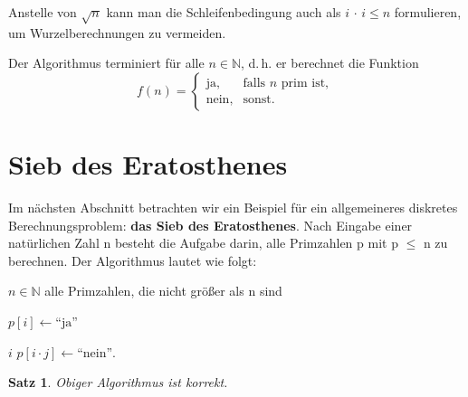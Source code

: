 \documentclass{article}
\newcommand{\N}{\mathbb{N}}%
\newtheorem{thm}{Satz}
\begin{document}
Anstelle von $\sqrt{n}$ kann man die Schleifenbedingung auch als $i\, \cdot \, i \le n$ formulieren, um Wurzelberechnungen zu vermeiden.

\medskip

Der Algorithmus terminiert für alle $n \in \mathbb{N}$, d.\,h. er berechnet die Funktion
\[
f(n) =
\begin{cases}
\text{ja}, & \text{falls $n$ prim ist},\\
\text{nein}, & \text{sonst}.
\end{cases}
\]


\section{Sieb des Eratosthenes}

Im nächsten Abschnitt betrachten wir ein Beispiel für ein allgemeineres diskretes Berechnungsproblem: \textbf{das Sieb des Eratosthenes}. Nach Eingabe einer natürlichen Zahl n besteht die Aufgabe darin, alle Primzahlen p mit p $\le$ n zu berechnen. Der Algorithmus lautet wie folgt:


\begin{algorithm}
\caption{Sieb des Eratosthenes}
\begin{algorithmic}[2]

\Require $n \in \N$
\Ensure alle Primzahlen, die nicht größer als n sind

$p[i] \gets \text{``ja''}$ 
\EndFor

    \State \Return $i$ 
    \State $p[i \cdot j] \gets \text{``nein''}$. 
    \EndFor
    \EndIf
    \EndFor



\end{algorithmic}
\end{algorithm}


\begin{thm}
   Obiger Algorithmus ist korrekt.
\end{thm}
\end{document}
